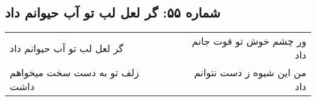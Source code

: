 \begin{center}
\section*{شماره ۵۵: گر لعل لب تو آب حیوانم داد}
\label{sec:055}
\begin{longtable}{l p{0.5cm} r}
گر لعل لب تو آب حیوانم داد
&&
ور چشم خوش تو قوت جانم داد
\\
زلف تو به دست سخت میخواهم داشت
&&
من این شیوه ز دست نتوانم داد
\\
\end{longtable}
\end{center}
